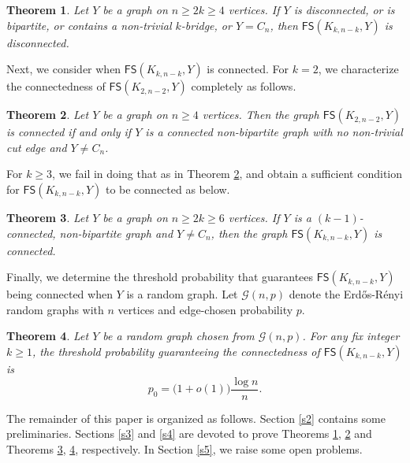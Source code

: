 \documentclass[11pt]{article}
\newtheorem{thm}{Theorem}[section]
\newcommand{\FS}{\mathsf{FS}}
\begin{document}
 \begin{thm}\label{T}
Let $Y$ be a graph on $n\ge 2k\ge 4$ vertices.  If $Y$ is disconnected, or is bipartite, or contains a non-trivial $k$-bridge, or $Y=C_n$, then $\FS(K_{k,n-k},Y)$ is disconnected.
\end{thm}
Next, we consider when $\mathsf{FS}(K_{k,n-k},Y)$ is connected. For $k=2$, we characterize the connectedness of $\mathsf{FS}(K_{2,n-2},Y)$ completely as follows.
\begin{thm}\label{TT}
Let $Y$ be a graph on $n\ge 4$ vertices. Then the graph $\FS(K_{2,n-2},Y)$ is connected if and only if $Y$ is a connected non-bipartite graph with no non-trivial cut edge and $Y\not=C_n$.
\end{thm}
For $k\geq 3$, we fail in doing that as in Theorem \ref{TT}, and obtain a sufficient condition for $\mathsf{FS}(K_{k,n-k},Y)$ to be connected as below.

\begin{thm}\label{TTT}
Let $Y$ be a graph on $n\ge 2k\ge 6$ vertices. If  $Y$ is a $(k-1)$-connected, non-bipartite graph and $Y\not=C_n$,
then the graph $\FS(K_{k,n-k},Y)$ is connected. \end{thm}






Finally, we determine the threshold probability that guarantees $\mathsf{FS}(K_{k,n-k}, Y)$ being connected when $Y$ is a random graph. Let $\mathcal{G}(n,p)$ denote the  Erd\H{o}s-R\'{e}nyi random graphs with $n$ vertices and edge-chosen probability $p$.
 
\begin{thm} \label{TTTT}
Let $Y$ be a random graph chosen from $\mathcal{G}(n,p)$. For any fix integer $k\ge 1$, the threshold probability guaranteeing the connectedness  of $\FS(K_{k,n-k},Y)$ is $$p_0=\big(1+o(1)\big)\frac{\log n} {n}.$$
\end{thm}

The remainder of this paper is organized as follows. Section \ref{s2} contains some preliminaries. Sections \ref{s3} and \ref{s4} are devoted to prove Theorems \ref{T}, \ref{TT} and Theorems \ref{TTT},  \ref{TTTT}, respectively. In Section \ref{s5}, we raise some open problems.
\end{document}
